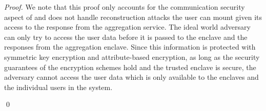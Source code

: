 \begin{proof}
We note that this proof only accounts for the communication security aspect of \sysname and does not handle reconstruction attacks the user can mount given its access to the response from the aggregation service. The ideal world adversary can only try to access the user data before it is passed to the enclave and the responses from the aggregation enclave. Since this information is protected with symmetric key encryption and attribute-based encryption, as long as the security guarantees of the encryption schemes hold and the trusted enclave is secure, the adversary cannot access the user data which is only available to the enclaves and the individual users in the system.   

 


















     
    


   
    
    
    
    
    
    
    
    

    \qed

\end{proof}




